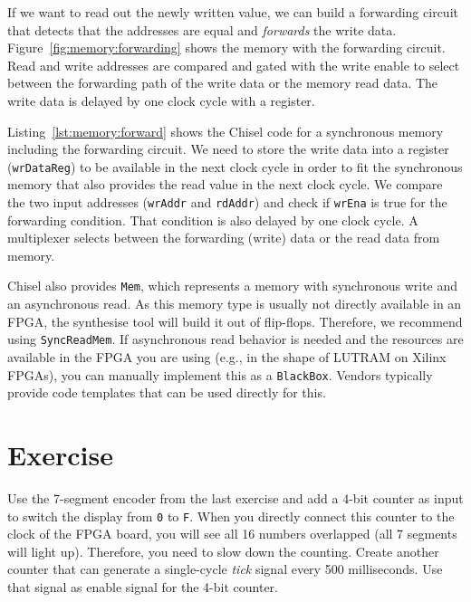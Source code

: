 \documentclass[%
    10pt,
    headinclude, footexclude,
    openright, %
    notitlepage,
    cleardoubleempty,
    headsepline,
    pointlessnumbers,
    bibtotoc, idxtotoc,
    ]{scrbook}
\newcommand{\code}[1]{{\small{\texttt{#1}}}}
\begin{document}
If we want to read out the newly written value, we can build a forwarding
circuit that detects that the addresses are equal and \emph{forwards} the
write data. Figure~\ref{fig:memory:forwarding} shows the memory with
the forwarding circuit. Read and write addresses are compared and gated with
the write enable to select between the forwarding path of the write data or the
memory read data. The write data is delayed by one clock cycle with a register.

Listing~\ref{lst:memory:forward} shows the Chisel code for a synchronous memory
including the forwarding circuit. We need to store the write data into a register
(\code{wrDataReg}) to be available in the next clock cycle in order to fit
the synchronous memory that also provides the read value in the next clock
cycle.
We compare the two input addresses (\code{wrAddr} and \code{rdAddr})
and check if \code{wrEna} is true for the forwarding condition.
That condition is also delayed by one clock cycle.
A multiplexer selects between the forwarding (write) data or the read
data from memory.


Chisel also provides \code{Mem}, which represents a memory with synchronous
write and an asynchronous read. As this memory type is usually not directly available
in an FPGA, the synthesise tool will build it out of flip-flops.
Therefore, we recommend using \code{SyncReadMem}. If asynchronous read behavior is needed and
the resources are available in the FPGA you are using (e.g., in the shape of LUTRAM on Xilinx
FPGAs), you can manually implement this as a \code{BlackBox}. Vendors typically provide
code templates that can be used directly for this.


\section{Exercise}

Use the 7-segment encoder from the last exercise and add a 4-bit counter as input
to switch the display from \code{0} to \code{F}. When you directly connect this
counter to the clock of the FPGA board, you will see all 16 numbers
overlapped (all 7 segments will light up).
Therefore, you need to slow down the counting. Create another
counter that can generate a single-cycle \emph{tick} signal every 500 milliseconds.
Use that signal as enable signal for the 4-bit counter.
\end{document}
